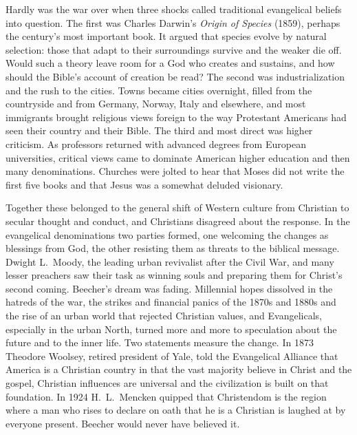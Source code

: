Hardly was the war over when three shocks called traditional evangelical beliefs into question. The
first was Charles Darwin's \emph{Origin of Species} (1859), perhaps the century's most important
book. It argued that species evolve by natural selection: those that adapt to their surroundings
survive and the weaker die off. Would such a theory leave room for a God who creates and sustains,
and how should the Bible's account of creation be read? The second was industrialization and the rush
to the cities. Towns became cities overnight, filled from the countryside and from Germany, Norway,
Italy and elsewhere, and most immigrants brought religious views foreign to the way Protestant
Americans had seen their country and their Bible. The third and most direct was higher criticism. As
professors returned with advanced degrees from European universities, critical views came to dominate
American higher education and then many denominations. Churches were jolted to hear that Moses did
not write the first five books and that Jesus was a somewhat deluded visionary.

Together these belonged to the general shift of Western culture from Christian to secular thought and
conduct, and Christians disagreed about the response. In the evangelical denominations two parties
formed, one welcoming the changes as blessings from God, the other resisting them as threats to the
biblical message. Dwight L.~Moody, the leading urban revivalist after the Civil War, and many lesser
preachers saw their task as winning souls and preparing them for Christ's second coming. Beecher's
dream was fading. Millennial hopes dissolved in the hatreds of the war, the strikes and financial
panics of the 1870s and 1880s and the rise of an urban world that rejected Christian values, and
Evangelicals, especially in the urban North, turned more and more to speculation about the future
and to the inner life. Two statements measure the change. In 1873 Theodore Woolsey, retired president
of Yale, told the Evangelical Alliance that America is a Christian country in that the vast majority
believe in Christ and the gospel, Christian influences are universal and the civilization is built
on that foundation. In 1924 H.~L.~Mencken quipped that Christendom is the region where a man who rises to declare on oath that he is a Christian is laughed at by everyone present. Beecher would
never have believed it.

